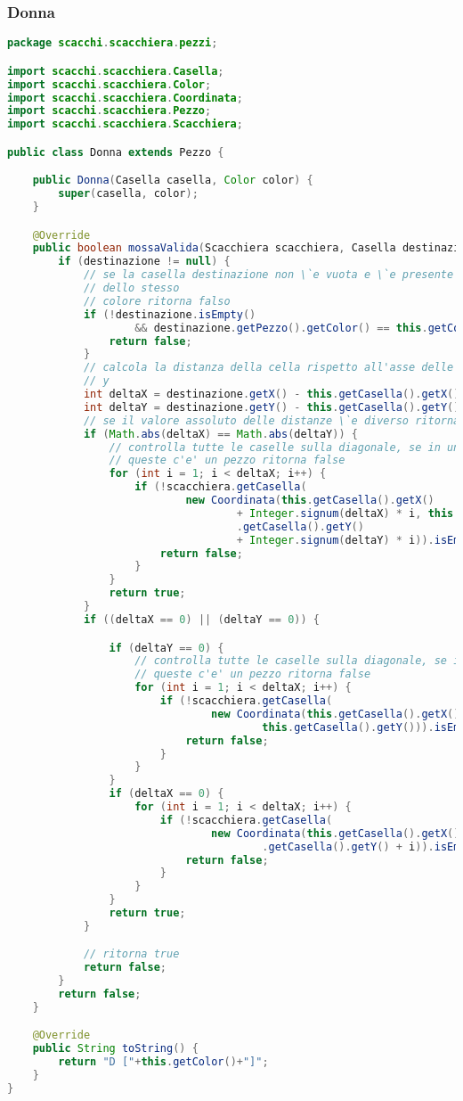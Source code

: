 \documentclass{article}
\begin{document}
\subsubsection{Donna}
\begin{lstlisting}[language=Java,escapechar=|]
package scacchi.scacchiera.pezzi;

import scacchi.scacchiera.Casella;
import scacchi.scacchiera.Color;
import scacchi.scacchiera.Coordinata;
import scacchi.scacchiera.Pezzo;
import scacchi.scacchiera.Scacchiera;

public class Donna extends Pezzo {

	public Donna(Casella casella, Color color) {
		super(casella, color);
	}

	@Override
	public boolean mossaValida(Scacchiera scacchiera, Casella destinazione) {
		if (destinazione != null) {
			// se la casella destinazione non \`e vuota e \`e presente un Pezzo
			// dello stesso
			// colore ritorna falso
			if (!destinazione.isEmpty()
					&& destinazione.getPezzo().getColor() == this.getColor()) {
				return false;
			}
			// calcola la distanza della cella rispetto all'asse delle x e delle
			// y
			int deltaX = destinazione.getX() - this.getCasella().getX();
			int deltaY = destinazione.getY() - this.getCasella().getY();
			// se il valore assoluto delle distanze \`e diverso ritorna false
			if (Math.abs(deltaX) == Math.abs(deltaY)) {
				// controlla tutte le caselle sulla diagonale, se in una di
				// queste c'e' un pezzo ritorna false
				for (int i = 1; i < deltaX; i++) {
					if (!scacchiera.getCasella(
							new Coordinata(this.getCasella().getX()
									+ Integer.signum(deltaX) * i, this
									.getCasella().getY()
									+ Integer.signum(deltaY) * i)).isEmpty()) {
						return false;
					}
				}
				return true;
			}
			if ((deltaX == 0) || (deltaY == 0)) {

				if (deltaY == 0) {
					// controlla tutte le caselle sulla diagonale, se in una di
					// queste c'e' un pezzo ritorna false
					for (int i = 1; i < deltaX; i++) {
						if (!scacchiera.getCasella(
								new Coordinata(this.getCasella().getX() + i,
										this.getCasella().getY())).isEmpty()) {
							return false;
						}
					}
				}
				if (deltaX == 0) {
					for (int i = 1; i < deltaX; i++) {
						if (!scacchiera.getCasella(
								new Coordinata(this.getCasella().getX(), this
										.getCasella().getY() + i)).isEmpty()) {
							return false;
						}
					}
				}
				return true;
			}

			// ritorna true
			return false;
		}
		return false;
	}

	@Override
	public String toString() {
		return "D ["+this.getColor()+"]";
	}
}
\end{lstlisting}
\end{document}
